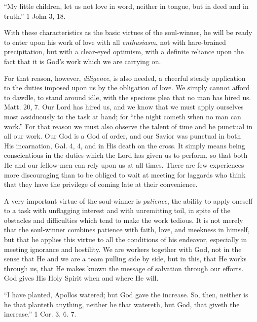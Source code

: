\documentclass[
]{book}
\begin{document}
``My little children, let us not love in word, neither in tongue, but in deed and in truth.'' 1 John 3, 18.

With these characteristics as the basic virtues of the soul-winner, he will be ready to enter upon his work of love with all \emph{enthusiasm}, not with hare-brained precipitation, but with a clear-eyed optimism, with a definite reliance upon the fact that it is God's work which we are carrying on.

For that reason, however, \emph{diligence}, is also needed, a cheerful steady application to the duties imposed upon us by the obligation of love. We simply cannot afford to dawdle, to stand around idle, with the specious plea that no man has hired us. Matt. 20, 7. Our Lord has hired us, and we know that we must apply ourselves most assiduously to the task at hand; for ``the night cometh when no man can work.'' For that reason we must also observe the talent of time and be punctual in all our work. Our God is a God of order, and our Savior was punctual in both His incarnation, Gal. 4, 4, and in His death on the cross. It simply means being conscientious in the duties which the Lord has given us to perform, so that both He and our fellow-men can rely upon us at all times. There are few experiences more discouraging than to be obliged to wait at meeting for laggards who think that they have the privilege of coming late at their convenience.

A very important virtue of the soul-winner is \emph{patience}, the ability to apply oneself to a task with unflagging interest and with unremitting toil, in spite of the obstacles and difficulties which tend to make the work tedious. It is not merely that the soul-winner combines patience with faith, love, and meekness in himself, but that he applies this virtue to all the conditions of his endeavor, especially in meeting ignorance and hostility. We are workers together with God, not in the sense that He and we are a team pulling side by side, but in this, that He works through us, that He makes known the message of salvation through our efforts. God gives His Holy Spirit when and where He will.

``I have planted, Apollos watered; but God gave the increase. So, then, neither is he that planteth anything, neither he that watereth, but God, that giveth the increase.'' 1 Cor. 3, 6. 7.
\end{document}
